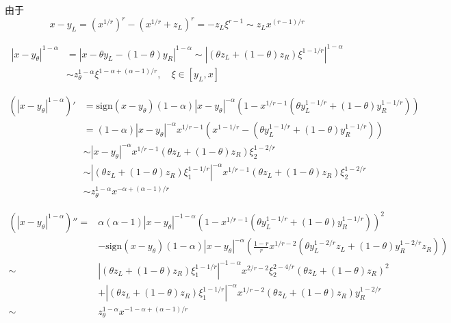 \documentclass{ctexart}
\theoremstyle{definition}
\theoremstyle{remark}
\numberwithin{equation}{section}
\begin{document}
由于
\begin{equation}
    x-y_L = (x^{1/r})^{r} - (x^{1/r} + z_L)^r = -z_L \xi^{r-1} \sim z_L x^{(r-1)/r}
\end{equation}

\begin{equation}
    \begin{aligned}
        |x-y_\theta|^{1-\alpha} & = |x-\theta y_L - (1-\theta) y_R |^{1-\alpha} \sim | (\theta z_L + (1-\theta) z_R) \xi^{1-1/r} |^{1-\alpha} \\
                                & \sim z_\theta^{1-\alpha} \xi^{1-\alpha + (\alpha-1)/r}, \quad \xi\in [y_L, x]
    \end{aligned}
\end{equation}

\begin{equation}
    \begin{aligned}
        (|x-y_\theta|^{1-\alpha})' & = \text{sign}(x-y_\theta)(1-\alpha)|x-y_\theta|^{-\alpha}(1-x^{1/r-1}(\theta y_L^{1-1/r} + (1-\theta)y_R^{1-1/r}))  \\
                                   & = (1-\alpha)|x-y_\theta|^{-\alpha}x^{1/r-1} (x^{1-1/r} - (\theta y_L^{1-1/r} + (1-\theta)y_R^{1-1/r}))              \\
                                   & \sim |x-y_\theta|^{-\alpha} x^{1/r-1} (\theta z_L + (1-\theta) z_R) \xi_2^{1-2/r}                                   \\
                                   & \sim | (\theta z_L + (1-\theta) z_R) \xi_1^{1-1/r} |^{-\alpha} x^{1/r-1} (\theta z_L + (1-\theta) z_R)\xi_2^{1-2/r} \\
                                   & \sim z_\theta^{1-\alpha} x^{-\alpha + (\alpha-1)/r}
    \end{aligned}
\end{equation}

\begin{equation}
    \begin{aligned}
        (|x-y_\theta|^{1-\alpha})''
        =    & \alpha(\alpha-1)|x-y_\theta|^{-1-\alpha} (1-x^{1/r-1}(\theta y_L^{1-1/r} + (1-\theta)y_R^{1-1/r}))^2                                     \\
             & - \text{sign}(x-y_\theta)(1-\alpha)|x-y_\theta|^{-\alpha}(\frac{1-r}{r} x^{1/r-2} (\theta y_L^{1-2/r} z_L + (1-\theta) y_R^{1-2/r} z_R)) \\
        \sim & | (\theta z_L + (1-\theta) z_R) \xi_1^{1-1/r} |^{-1-\alpha} x^{2/r-2} \xi_2^{2-4/r} (\theta z_L + (1-\theta) z_R)^2                      \\
             & + | (\theta z_L + (1-\theta) z_R) \xi_1^{1-1/r} |^{-\alpha} x^{1/r-2} (\theta z_L + (1-\theta) z_R)y_R^{1-2/r}                           \\
        \sim & z_\theta^{1-\alpha} x^{-1-\alpha + (\alpha-1)/r}
    \end{aligned}
\end{equation}
\end{document}
